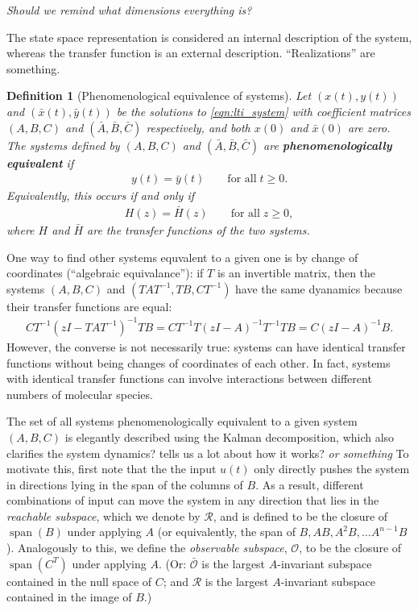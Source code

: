 \documentclass[11 pt]{article}
\newcommand{\plr}[1]{{\color{blue}\it #1}}
\newcommand{\reachable}{\mathcal{R}}
\newcommand{\unobservable}{\bar{\mathcal{O}}}
\DeclareMathOperator{\spn}{span}
\newtheorem{definition}{Definition}
\begin{document}
\plr{Should we remind what dimensions everything is?}

The state space representation is considered an internal description of the
system, whereas the transfer function is an external description. 
``Realizations'' are something.

\begin{definition}[Phenomenological equivalence of systems]
    Let $(x(t),y(t))$ and $(\bar x(t),\bar y(t))$ be the solutions to \eqref{eqn:lti_system}
    with coefficient matrices $(A,B,C)$ and $(\bar A,\bar B,\bar C)$ respectively,
    and both $x(0)$ and $\bar x(0)$ are zero. 
    The systems defined by $(A,B,C)$ and $(\bar A,\bar B,\bar C)$ are
    \textbf{phenomenologically equivalent} 
    if
    \begin{align*}
        y(t) = \bar y(t) \qquad \text{for all} \; t \ge 0.
    \end{align*}
    Equivalently, this occurs if and only if
    \begin{align*}
        H(z) = \bar H(z)  \qquad \text{for all} \; z \ge 0,
    \end{align*}
    where $H$ and $\bar H$ are the transfer functions of the two systems.
\end{definition}

One way to find other systems equvalent to a given one
is by change of coordinates (``algebraic equivalance''):
if $T$ is an invertible matrix, then the systems $(A,B,C)$ and $(TAT^{-1},TB,CT^{-1})$
have the same dyanamics because their transfer functions are equal:
\begin{align*}
    CT^{-1}( zI - TAT^{-1})^{-1}TB
    =
    CT^{-1}T( zI - A)^{-1}T^{-1}TB
    =
    C( zI - A)^{-1}B .
\end{align*}
However, the converse is not necessarily true: 
systems can have identical transfer functions without being changes of coordinates of each other.
In fact, systems with identical transfer functions can involve interactions between different
numbers of molecular species.

The set of all systems phenomenologically equivalent to a given system $(A,B,C)$ 
is elegantly described using the Kalman decomposition,
which also clarifies the system dynamics? tells us a lot about how it works? \plr{or something}
To motivate this, first note that the the input $u(t)$ only directly pushes the system
in directions lying in the span of the columns of $B$.
As a result, different combinations of input can 
move the system in any direction that lies in the \emph{reachable subspace},
which we denote by $\reachable$,
and is defined to be the closure of $\spn(B)$ under applying $A$
(or equivalently, the span of $B, AB, A^2B, \ldots A^{n-1}B$).
Analogously to this, we define
the \emph{observable subspace}, $\mathcal{O}$,
to be the closure of $\spn(C^T)$ under applying $A$.
(Or: $\unobservable$ is the largest $A$-invariant subspace
contained in the null space of $C$;
and $\reachable$ is the largest $A$-invariant subspace contained in the image of $B$.)
\end{document}

